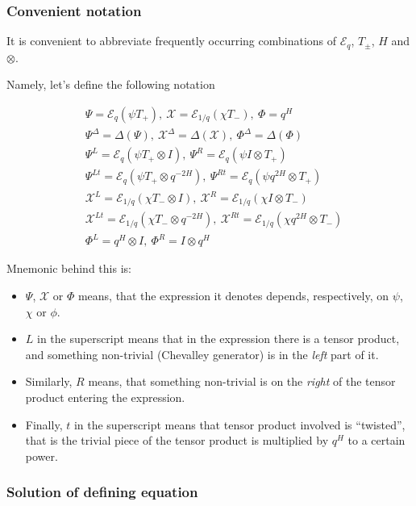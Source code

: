 \documentclass{article}
\newcommand{\lb}{\left (}
\newcommand{\rb}{\right )}
\newcommand{\B}[1]{\lb #1 \rb}
\newcommand{\be}{\begin{eqnarray}}
\newcommand{\ee}{\end{eqnarray}}
\newcommand {\?}{\textit{???}}
\newcommand{\me}[0]{\mathcal{E}}
\newcommand{\Tp}[1][]{T_{+ #1}}
\newcommand{\Tm}[1][]{T_{- #1}}
\def\Chi{\mathcal{X}}
\newcommand{\EChiL}[1][]{\Chi^L_{#1}}
\newcommand{\EChiR}[1][]{\Chi^R_{#1}}
\newcommand{\EChiLT}[1][]{\Chi^{Lt}_{#1}}
\newcommand{\EChiRT}[1][]{\Chi^{Rt}_{#1}}
\newcommand{\EChiD}[1][]{\Chi^\Delta_{#1}}
\newcommand{\EPsiL}[1][]{\Psi^L_{#1}}
\newcommand{\EPsiR}[1][]{\Psi^R_{#1}}
\newcommand{\EPsiLT}[1][]{\Psi^{Lt}_{#1}}
\newcommand{\EPsiRT}[1][]{\Psi^{Rt}_{#1}}
\newcommand{\EPsiD}[1][]{\Psi^\Delta_{#1}}
\newcommand{\QPhiL}[1][]{\Phi^L_{#1}}
\newcommand{\QPhiR}[1][]{\Phi^R_{#1}}
\newcommand{\QPhiD}[1][]{\Phi^\Delta_{#1}}
\newcommand{\comul}[1]{\Delta \lb #1 \rb}
\begin{document}
\subsubsection{Convenient notation}

It is convenient to abbreviate frequently occurring combinations of $\me_q$, $T_\pm$, $H$ and $\otimes$.

Namely, let's define the following notation

\be
& \Psi = \me_q \B{\psi \Tp},\ \Chi = \me_{1/q} \B{\chi \Tm},\ \Phi = q^H \nonumber \\
& \EPsiD = \comul{\Psi},\ \EChiD = \comul{\Chi},\ \QPhiD = \comul{\Phi} \nonumber \\
& \EPsiL = \me_q \lb \psi T_+ \otimes I\rb,\ \EPsiR = \me_q \lb \psi I \otimes T_+ \rb \nonumber \\
\label{macrolanguage-sl2}
& \EPsiLT = \me_q \lb \psi T_+ \otimes q^{-2H}\rb,\ \EPsiRT = \me_q \lb \psi q^{2H} \otimes T_+ \rb \\
& \EChiL = \me_{1/q} \lb \chi T_- \otimes I\rb,\ \EChiR = \me_{1/q} \lb \chi I \otimes T_- \rb \nonumber \\
& \EChiLT = \me_{1/q} \lb \chi T_- \otimes q^{-2H}\rb,\ \EChiRT = \me_{1/q} \lb \chi q^{2H} \otimes T_- \rb \nonumber \\
& \QPhiL = q^H \otimes I,\ \QPhiR = I \otimes q^H \nonumber 
\ee

Mnemonic behind this is:
\begin{itemize}
\item $\Psi$, $\Chi$ or $\Phi$ means, that the expression it denotes depends, respectively,
on $\psi$, $\chi$ or $\phi$.
\item $L$ in the superscript means that in the expression there is a tensor product,
and something non-trivial (Chevalley generator) is in the {\it left} part of it.
\item Similarly, $R$ means, that something non-trivial is on the {\it right} of the tensor product entering the expression.
\item Finally, $t$ in the superscript means that tensor product involved is ``twisted'', that is the trivial piece
of the tensor product is multiplied by $q^H$ to a certain power.
\end{itemize}

\subsubsection{Solution of defining equation}
\end{document}
